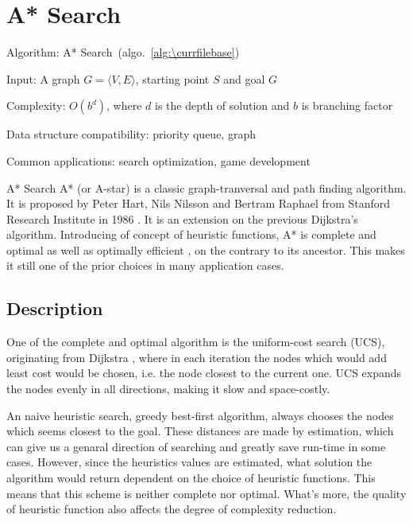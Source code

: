 \documentclass[catalog.tex]{subfiles}
\begin{document}
%
%

\def\pbname{A* Search} %

\section{\pbname} 

\begin{overview}
\item [Algorithm:] A* Search~(algo.~\ref{alg:\currfilebase}) 
\item [Input:] A graph $G=\langle V,E\rangle$, starting point $S$ and goal $G$
\item [Complexity:] $O(b^d)$, where $d$ is the depth of solution and $b$ is branching factor
\item [Data structure compatibility:] priority queue, graph
\item [Common applications:] search optimization, game development
\end{overview}


\begin{problem}{\pbname}
	A* (or A-star) is a classic graph-tranversal and path finding algorithm. It is proposed by Peter Hart, Nils Nilsson and Bertram Raphael from Stanford Research Institute in 1986 \cite{hart1968formal}. It is an extension on the previous Dijkstra's algorithm. Introducing of concept of heuristic functions, A* is complete and optimal as well as optimally efficient \cite{russell_artificial_2010}, on the contrary to its ancestor. This makes it still one of the prior choices in many application cases. 
\end{problem}


\subsection*{Description}

One of the complete and optimal algorithm is the uniform-cost search (UCS), originating from Dijkstra \cite{russell_artificial_2010}, where in each iteration the nodes which would add least cost would be chosen, i.e. the node closest to the current one. UCS expands the nodes evenly in all directions, making it slow and space-costly. 

An naive heuristic search, greedy best-first algorithm, always chooses the nodes which seems closest to the goal. These distances are made by estimation, which can give us a genaral direction of searching and greatly save run-time in some cases. However, since the heuristics values are estimated, what solution the algorithm would return dependent on the choice of heuristic functions. This means that this scheme is neither complete nor optimal. What's more, the quality of heuristic function also affects the degree of complexity reduction.
\end{document}
